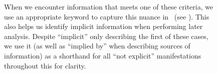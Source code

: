\begin{figure}[h!]

When we encounter information that meets one of these criteria, we use an
appropriate keyword to capture this nuance in \ourApproachGlossary{}\ifnotpaper\
    (see )\fi. This also helps us identify implicit
information when performing later analysis. Despite ``implicit'' only
describing the first of these cases, we use it (as well as ``implied by'' when
describing sources of information) as a shorthand for all ``not explicit''
manifestations throughout this \docType{} for clarity.

\ifnotpaper
    


\end{figure}
